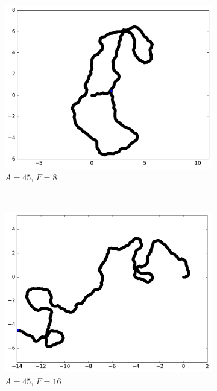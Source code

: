 \begin{figure}[htb]
\begin{subfigure}[t]{\subImgWmo}
			\centering
			\includegraphics[width=\textwidth]{figures/ch3/synTraj_219_45_8}
			\caption[$A = 45$, $F=8$]{$A = 45$, $F=8$}
			\label{fig:synTraj_219_45_8}
		\end{subfigure}
		~
		\begin{subfigure}[t]{\subImgWmo}
			\centering
			\includegraphics[width=\textwidth]{figures/ch3/synTraj_219_45_16}
			\caption[$A = 45$, $F=16$]{$A = 45$, $F=16$}
			\label{fig:synTraj_219_45_16}
		\end{subfigure}
		~
		\begin{subfigure}[t]{\subImgWmo}
			\centering

\end{subfigure}
\end{figure}
